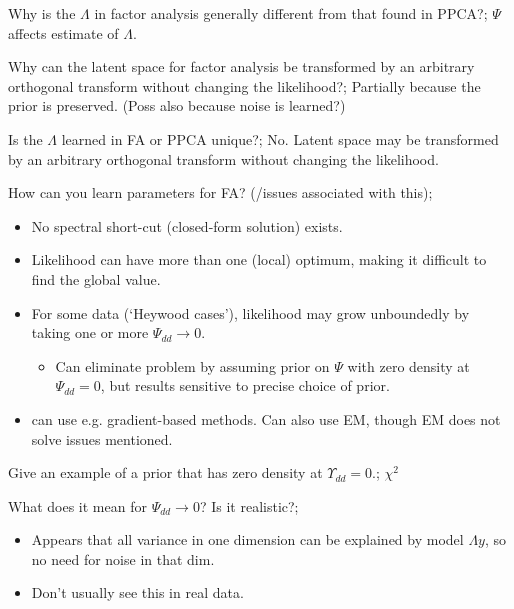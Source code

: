 \documentclass{article}
\begin{document}
Why is the $\Lambda$ in factor analysis generally different from that found in PPCA?; $\Psi$ affects estimate of $\Lambda$.

Why can the latent space for factor analysis be transformed by an arbitrary orthogonal transform without changing the likelihood?; Partially because the prior is preserved. (Poss also because noise is learned?)

Is the $\Lambda$ learned in FA or PPCA unique?; No. Latent space may be transformed by an arbitrary orthogonal transform without changing the likelihood.

How can you learn parameters for FA? (/issues associated with this); \begin{itemize} \item No spectral short-cut (closed-form solution) exists.  \item Likelihood can have more than one (local) optimum, making it difficult to find the global value.  \item For some data (`Heywood cases'), likelihood may grow unboundedly by taking one or more $\Psi_{dd}\rightarrow 0$.  \begin{itemize} \item Can eliminate problem by assuming prior on $\Psi$ with zero density at $\Psi_{dd}=0$, but results sensitive to precise choice of prior.  \end{itemize} \item can use e.g. gradient-based methods. Can also use EM, though EM does not solve issues mentioned.  \end{itemize}

Give an example of a prior that has zero density at $\Upsilon_{dd}=0$.; $\chi^2$ 

What does it mean for $\Psi_{dd}\rightarrow 0$? Is it realistic?; \begin{itemize} \item Appears that all variance in one dimension can be explained by model $\Lambda y$, so no need for noise in that dim.  \item Don't usually see this in real data.  \end{itemize}
\end{document}
